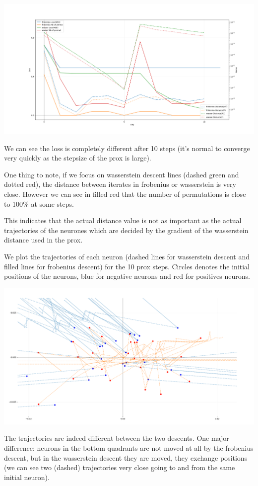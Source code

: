 \includegraphics[width=1.0\textwidth]{imgs/grand_pas_10steps.png}

We can see the loss is completely different after 10 steps (it's normal to converge very quickly as the stepsize of the prox is large).

One thing to note, if we focus on wasserstein descent lines (dashed green and dotted red), the distance between iterates in frobenius or wasserstein is very close. However we can see in filled red that the number of permutations is close to 100\% at some steps.

This indicates that the actual distance value is not as important as the actual trajectories of the neurones which are decided by the gradient of the wasserstein distance used in the prox.

We plot the trajectories of each neuron (dashed lines for wasserstein descent and filled lines for frobenius descent) for the 10 prox steps. Circles denotes the initial positions of the neurons, blue for negative neurons and red for positives neurons.

\includegraphics[width=1.0\textwidth]{imgs/grand_pas_10steps_trajs.png}

The trajectories are indeed different between the two descents. One major difference: neurons in the bottom quadrants are not moved at all by the frobenius descent, but in the wasserstein descent they are moved, they exchange positions (we can see two (dashed) trajectories very close going to and from the same initial neuron).

